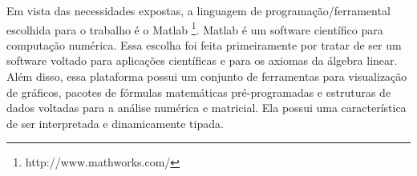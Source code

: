 Em vista das necessidades expostas, a linguagem de programação/ferramental escolhida para o trabalho é o Matlab \footnote{http://www.mathworks.com/}. Matlab é um software científico para computação numérica. Essa escolha foi feita primeiramente por tratar de ser um software voltado para aplicações científicas e para os axiomas da álgebra linear. Além disso, essa plataforma possui um conjunto de ferramentas para visualização de gráficos, pacotes de fórmulas matemáticas pré-programadas e estruturas de dados voltadas para a análise numérica e matricial. Ela possui uma característica de ser interpretada e dinamicamente tipada.
